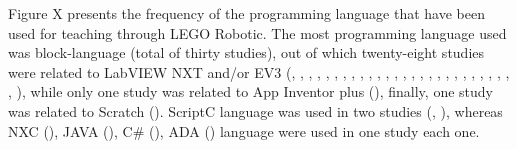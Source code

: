 \documentclass[conference]{IEEEtran}
\begin{document}
Figure X presents the frequency of the programming language that have been used for teaching through LEGO Robotic. The most programming language used was block-language (total of thirty studies), out of which twenty-eight studies were related to LabVIEW NXT and/or EV3 (\cite{E01}, \cite{E03}, \cite{E04}, \cite{E05}, \cite{E06}, \cite{E07}, \cite{E08}, \cite{E09}, \cite{E10}, \cite{E11}, \cite{E12}, \cite{E14}, \cite{E15}, \cite{E16}, \cite{E20}, \cite{E21}, \cite{E24}, \cite{E25}, \cite{E26}, \cite{E27}, \cite{E28}, \cite{E30}, \cite{E31}, \cite{E32}, \cite{E33}, \cite{E34}, \cite{E35}, \cite{E36} ), while only one study was related to App Inventor plus (\cite{E29}), finally, one study was related to Scratch (\cite{E18}). ScriptC language was used in two studies (\cite{E13}, \cite{E19}), whereas NXC (\cite{E02}), JAVA (\cite{E22}), C\# (\cite{E02}), ADA (\cite{E17}) language were used in one study each one. 

%
%

\end{document}

